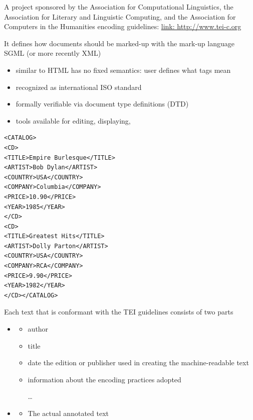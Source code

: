 \documentclass[a4paper,landscape,headrule,footrule,xetex]{foils}
\begin{document}

A project sponsored by the Association for
Computational Linguistics, the Association for
Literary and Linguistic Computing, and the
Association for Computers in the Humanities
encoding guidelines: \url{link: http://www.tei-c.org}

It defines how documents should be marked-up
with the mark-up language SGML (or more
recently XML)




\begin{itemize}
\item {} similar to HTML
has no fixed semantics: user defines what tags
mean
\item recognized as international ISO standard
\item formally verifiable via document type definitions
(DTD)
\item tools available for editing, displaying,
\end{itemize}
\begin{small}
\begin{verbatim}
<CATALOG>
<CD>
<TITLE>Empire Burlesque</TITLE>
<ARTIST>Bob Dylan</ARTIST>
<COUNTRY>USA</COUNTRY>
<COMPANY>Columbia</COMPANY>
<PRICE>10.90</PRICE>
<YEAR>1985</YEAR>
</CD>
<CD>
<TITLE>Greatest Hits</TITLE>
<ARTIST>Dolly Parton</ARTIST>
<COUNTRY>USA</COUNTRY>
<COMPANY>RCA</COMPANY>
<PRICE>9.90</PRICE>
<YEAR>1982</YEAR>
</CD></CATALOG>
\end{verbatim}
\end{small}

Each text that is conformant with the TEI guidelines
consists of two parts
\begin{itemize}
\item {}
  \begin{itemize}
  \item author
  \item title
  \item date the edition or publisher used in creating the machine-readable text
  \item information about the encoding practices adopted
   \item[\ldots]
   \end{itemize}
 \item {}
   \begin{itemize}
   \item The actual annotated text
   \end{itemize}
 \end{itemize}
   
\end{document}
